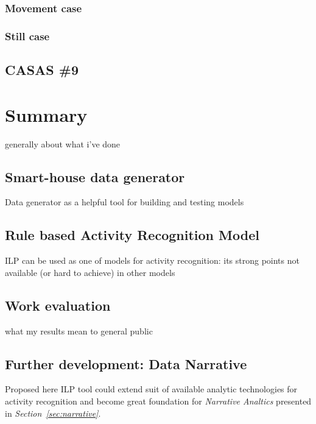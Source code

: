 \documentclass[12pt, a4paper, pdflatex, leqno, twoside, openright]{report}
\begin{document}
    \subsection{Movement case}
    \subsection{Still case}

  \section{CASAS \#9}


\chapter{Summary\label{ch:summary}}
generally about what i've done

  \section{Smart-house data generator}
Data generator as a helpful tool for building and testing models\\

  \section{Rule based Activity Recognition Model}
ILP can be used as one of models for activity recognition: its strong points not available (or hard to achieve) in other models

  \section{Work evaluation}
what my results mean to general public

  \section{Further development: Data Narrative\label{sec:narrative}}

Proposed here ILP tool could extend suit of available analytic technologies for activity recognition and become great foundation for \emph{Narrative Analtics} presented in \emph{Section~\ref{sec:narrative}}.
\end{document}
